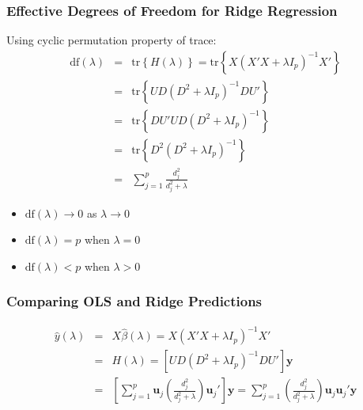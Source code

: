 \begin{frame}
  \frametitle{Effective Degrees of Freedom for Ridge Regression}
 
  Using cyclic permutation property of trace:
  \begin{eqnarray*}
    \mbox{df}(\lambda) &=&  \mbox{tr}\left\{ H(\lambda) \right\} = \mbox{tr}\left\{ X(X'X + \lambda I_p)^{-1}X' \right\}\\
 &=& \mbox{tr}\left\{UD\left( D^2 + \lambda I_p \right)^{-1}DU'\right\}\\
 &=& \mbox{tr}\left\{DU'UD\left( D^2 + \lambda I_p \right)^{-1}\right\}\\
 &=& \mbox{tr}\left\{D^2\left( D^2 + \lambda I_p \right)^{-1}\right\}\\
 &=& \sum_{j=1}^p\frac{d_j^2}{d_j^2 + \lambda}
  \end{eqnarray*}

  \begin{itemize}
    \item $\mbox{df}(\lambda) \rightarrow 0$ as $\lambda \rightarrow 0$
    \item $\mbox{df}(\lambda) = p$ when $\lambda = 0$
    \item $\mbox{df}(\lambda) < p$ when $\lambda > 0$
  \end{itemize}
\end{frame}
\begin{frame}
  \frametitle{Comparing OLS and Ridge Predictions}

  \begin{eqnarray*}
  \widehat{y}(\lambda) &=&  X\widehat{\beta}(\lambda) = X\left( X'X + \lambda I_p \right)^{-1}X' \\
  &=& H(\lambda) =  \left[ UD\left( D^2 + \lambda I_p \right)^{-1}DU' \right]\mathbf{y} \\
  &=& \left[ \sum_{j=1}^p \mathbf{u}_j  \left( \frac{d_j^2}{d_j^2 + \lambda} \right)\mathbf{u}_j'\right]\mathbf{y} =  \sum_{j=1}^p   \left( \frac{d_j^2}{d_j^2 + \lambda} \right)\mathbf{u}_j\mathbf{u}_j'\mathbf{y}
  \end{eqnarray*}

\end{frame}
